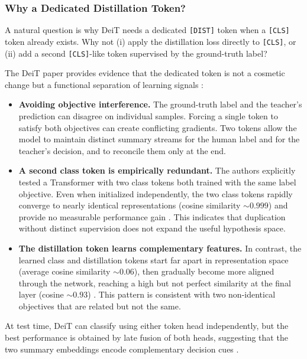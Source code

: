 \subsubsection{Why a Dedicated Distillation Token?}
\label{subsubsec:chapter18_deit_why_token}

\noindent
A natural question is why DeiT needs a dedicated \texttt{[DIST]} token when a \texttt{[CLS]} token already exists. Why not (i) apply the distillation loss directly to \texttt{[CLS]}, or (ii) add a second \texttt{[CLS]}-like token supervised by the ground-truth label?

\noindent
The DeiT paper provides evidence that the dedicated token is not a cosmetic change but a functional separation of learning signals \cite{touvron2021_deit}:
\begin{itemize}
	\item \textbf{Avoiding objective interference.}
	The ground-truth label and the teacher's prediction can disagree on individual samples. Forcing a single token to satisfy both objectives can create conflicting gradients. Two tokens allow the model to maintain distinct summary streams for the human label and for the teacher's decision, and to reconcile them only at the end.
	
	\item \textbf{A second class token is empirically redundant.}
	The authors explicitly tested a Transformer with two class tokens both trained with the same label objective. Even when initialized independently, the two class tokens rapidly converge to nearly identical representations (cosine similarity \(\sim 0.999\)) and provide no measurable performance gain \cite{touvron2021_deit}. This indicates that duplication without distinct supervision does not expand the useful hypothesis space.
	
	\item \textbf{The distillation token learns complementary features.}
	In contrast, the learned class and distillation tokens start far apart in representation space (average cosine similarity \(\sim 0.06\)), then gradually become more aligned through the network, reaching a high but not perfect similarity at the final layer (cosine \(\sim 0.93\)) \cite{touvron2021_deit}. This pattern is consistent with two non-identical objectives that are related but not the same.
\end{itemize}

\noindent
At test time, DeiT can classify using either token head independently, but the best performance is obtained by late fusion of both heads, suggesting that the two summary embeddings encode complementary decision cues \cite{touvron2021_deit}.


